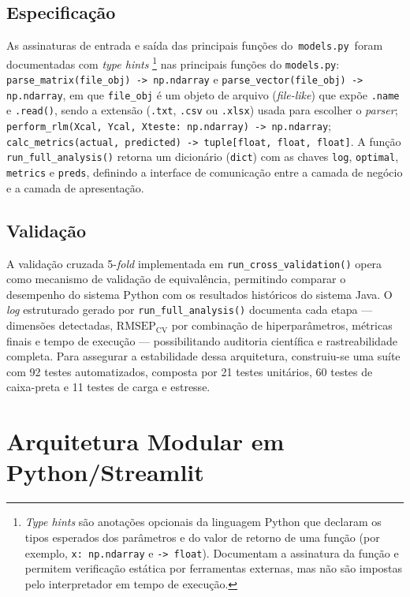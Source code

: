 \subsection{Especificação}
As assinaturas de entrada e saída das principais funções do~\verb|models.py|~foram documentadas com \textit{type hints} \footnote{\textit{Type hints} são anotações opcionais da linguagem Python que declaram os tipos esperados dos parâmetros e do valor de retorno de uma função
(por exemplo, \texttt{x: np.ndarray} e \texttt{-> float}). Documentam a assinatura da função e permitem verificação estática por ferramentas externas, mas não são impostas pelo interpretador em tempo de execução.} nas principais funções do \texttt{models.py}:
\texttt{parse\_matrix(file\_obj) -> np.ndarray} e
\texttt{parse\_vector(file\_obj) -> np.ndarray}, em que \texttt{file\_obj} é um
objeto de arquivo (\textit{file-like}) que expõe \texttt{.name} e \texttt{.read()},
sendo a extensão (\texttt{.txt}, \texttt{.csv} ou \texttt{.xlsx}) usada para
escolher o \textit{parser};
\texttt{perform\_rlm(Xcal, Ycal, Xteste: np.ndarray) -> np.ndarray};
\texttt{calc\_metrics(actual, predicted) -> tuple[float, float, float]}.
A função \texttt{run\_full\_analysis()} retorna um dicionário (\texttt{dict})
com as chaves \texttt{log}, \texttt{optimal}, \texttt{metrics} e \texttt{preds},
definindo a interface de comunicação entre a camada de negócio e a camada de apresentação.

\subsection{Validação}
A validação cruzada 5-\textit{fold} implementada em \texttt{run\_cross\_validation()} opera como mecanismo de validação de equivalência, permitindo comparar o desempenho do sistema Python com os resultados históricos do sistema Java. O \textit{log} estruturado gerado por \texttt{run\_full\_analysis()} documenta cada etapa — dimensões detectadas, $\text{RMSEP}_{\text{CV}}$ por combinação de hiperparâmetros, métricas finais e tempo de execução — possibilitando auditoria científica e rastreabilidade completa. Para assegurar a estabilidade dessa arquitetura, construiu-se uma suíte com 92 testes automatizados, composta por 21 testes unitários, 60 testes de caixa-preta e 11 testes de carga e estresse.

\section{Arquitetura Modular em Python/Streamlit}

